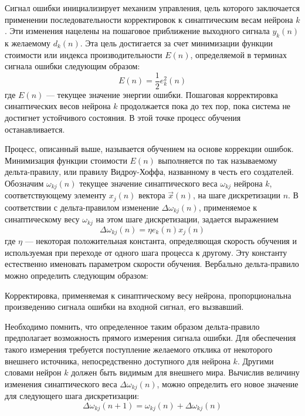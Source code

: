 Сигнал ошибки инициализирует механизм управления, цель которого заключается применении последовательности корректировок к синаптическим весам нейрона $k$.
Эти изменения нацелены на пошаговое приближение выходного сигнала $y_k(n)$ к желаемому $d_k(n)$.
Эта цель достигается за счет минимизации функции стоимости или индекса производительности $E(n)$, определяемой в терминах сигнала ошибки следующим образом:
\begin{equation}
E(n) = \frac12 e_k^2(n)
\end{equation}
где $E(n)$ --- текущее значение энергии ошибки.
Пошаговая корректировка синаптических весов нейрона $k$  продолжается пока до тех пор, пока система не достигнет устойчивого состояния.
В этой точке процесс обучения останавливается.

Процесс, описанный выше, называется обучением на основе коррекции ошибок.
Минимизация функции стоимости $E(n)$ выполняется по так называемому дельта-правилу, или правилу Видроу-Хоффа, названному в честь его создателей.
Обозначим $\omega_{kj}(n)$  текущее значение синаптического веса $\omega_{kj}$ нейрона $k$, соответствующему элементу $x_j(n)$ вектора $\vec x(n)$, на шаге дискретизации $n$.
В соответствии с дельта-правилом изменение $\Delta\omega_{kj}(n)$, применяемое  к синаптическому весу $\omega_{kj}$ на этом шаге дискретизации, задается выражением
\begin{equation}
\Delta\omega_{kj}(n) = \eta e_k(n)x_j(n)
\end{equation}
где $\eta$ --- некоторая положительная константа, определяющая скорость обучения и используемая при переходе  от одного шага процесса к другому. 
Эту константу естественно именовать параметром скорости обучения.
Вербально дельта-правило можно определить следующим образом:

Корректировка, применяемая к синаптическому весу нейрона, пропорциональна произведению сигнала ошибки на входной сигнал, его вызвавший.

Необходимо помнить, что  определенное таким образом дельта-правило предполагает возможность прямого измерения сигнала ошибки.
Для обеспечения такого измерения требуется поступление желаемого отклика от некоторого внешнего источника, непосредственно доступного для нейрона $k$.
Другими словами нейрон $k$ должен быть видимым для внешнего мира.
Вычислив величину изменения синаптического веса $\Delta\omega_{kj}(n)$, можно определить его новое значение для следующего шага дискретизации:
\begin{equation}
\Delta\omega_{kj}(n+1) = \omega_{kj}(n) +\Delta\omega_{kj}(n)
\end{equation}


